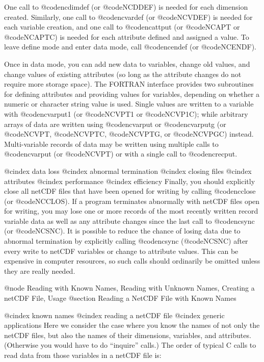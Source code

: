One call to @code{ncdimdef} (or @code{NCDDEF}) is needed for each
dimension created.  Similarly, one call to @code{ncvardef} (or
@code{NCVDEF}) is needed for each variable creation, and one call to
@code{ncattput} (or @code{NCAPT} or @code{NCAPTC}) is needed for each
attribute defined and assigned a value.  To leave define
mode and enter data mode, call @code{ncendef} (or
@code{NCENDF}).

Once in data mode, you can add new data to variables, change old values,
and change values of existing attributes (so long as the attribute
changes do not require more storage space).
The FORTRAN interface provides two subroutines for defining attributes
and providing values for variables, depending on whether a numeric or
character string value is used.
Single
values are written to a variable with @code{ncvarput1} (or @code{NCVPT1}
or @code{NCVP1C}); while arbitrary arrays of data are written using
@code{ncvarput} or @code{ncvarputg} (or @code{NCVPT}, @code{NCVPTC},
@code{NCVPTG}, or @code{NCVPGC}) instead.  Multi-variable records of
data may be written using multiple calls to @code{ncvarput} (or @code{NCVPT})
or with a single call to @code{ncrecput}.

@cindex data loss
@cindex abnormal termination
@cindex closing files
@cindex attributes
@cindex performance
@cindex efficiency
Finally, you should explicitly close all netCDF
files that have been opened for writing by calling @code{ncclose} (or
@code{NCCLOS}).  If a program terminates
abnormally with netCDF files open for writing, you may lose one or more
records of the most recently written record variable data as well as any
attribute changes since the last call to @code{ncsync} (or
@code{NCSNC}).  It is possible to reduce the chance of losing data due
to abnormal termination by explicitly calling @code{ncsync}
(@code{NCSNC}) after every write to netCDF variables or change to
attribute values.  This can be expensive in computer resources, so
such calls should ordinarily be omitted unless they are really needed.

@node Reading with Known Names, Reading with Unknown Names, Creating a netCDF File, Usage
@section Reading a NetCDF File with Known Names

@cindex known names
@cindex reading a netCDF file
@cindex generic applications
Here we consider the case where
you know the names of not only the netCDF files, but also the names of
their dimensions, variables, and attributes.
(Otherwise you would have to do ``inquire'' calls.)
The order of typical C calls to read data from those
variables in a netCDF file is:

